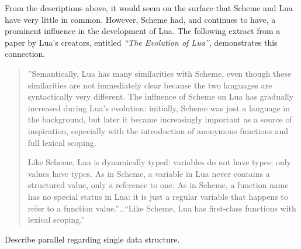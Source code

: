 From the descriptions above, it would seem on the surface that Scheme and Lua
have very little in common. However, Scheme had, and continues to have, a
prominent influence in the development of Lua. The following extract from a
paper by Lua's creators, entitled \emph{``The Evolution of Lua''}, demonstrates this connection.

\begin{quotation}
''Semantically, Lua has many similarities with Scheme, even though these
similarities are not immediately clear because the two languages are
syntactically very different. The influence of Scheme on Lua has gradually
increased during Lua's evolution: initially, Scheme was just a language in the
background, but later it became increasingly important as a source of
inspiration, especially with the introduction of anonymous functions and full
lexical scoping.

Like Scheme, Lua is dynamically typed: variables do not have types; only values
have types. As in Scheme, a variable in Lua never contains a structured value,
only a reference to one. As in Scheme, a function name has no special status in
Lua: it is just a regular variable that happens to refer to a function
value.''\ldots ``Like Scheme, Lua has first-class functions with lexical
scoping.''~\cite[Sec~2]{evolua}
\end{quotation}

Describe parallel regarding single data structure.
